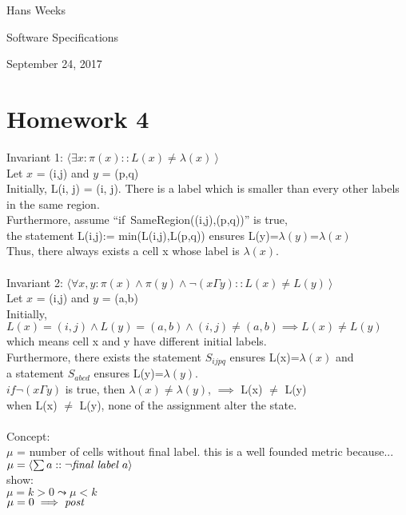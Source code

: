 \documentclass{article}
\begin{document}
\hfill Hans Weeks

\hfill Software Specifications

\hfill September 24, 2017
\section*{Homework 4}
Invariant 1: $\langle \exists x: \pi(x) :: L(x) \neq \lambda(x) \ \rangle$ \\
Let $x$ = (i,j)  and $y$ = (p,q)\\
Initially, L(i, j) = (i, j). There is a label which is smaller than every other labels in the same region.\\
Furthermore, assume ``if\ SameRegion((i,j),(p,q))'' is true,\\
the statement L(i,j):= min(L(i,j),L(p,q)) ensures L(y)=$\lambda(y)$=$\lambda(x)$\\
Thus, there always exists a cell x whose label is $\lambda(x)$.\\
\\
Invariant 2: $\langle \forall x,y: \pi(x) \wedge \pi(y) \wedge \neg(x \Gamma y) :: L(x) \neq L(y) \ \rangle$ \\
Let $x$ = (i,j)  and $y$ = (a,b)\\
Initially, $L(x) = (i,j) \wedge L(y) = (a,b) \wedge (i,j)\neq(a,b) \implies L(x) \neq L(y)$\\
which means cell x and y have different initial labels.\\
Furthermore, there exists the statement $S_{ijpq}$ ensures L(x)=$\lambda(x)$ and\\a statement $S_{abcd}$ ensures L(y)=$\lambda(y)$.\\
$if \neg(x \Gamma y)$ is true, then $\lambda(x)$$\neq$$\lambda(y)$, $\implies$ L(x) $\neq$ L(y)\\
when L(x) $\neq$ L(y), none of the assignment alter the state.\\
\\
Concept:\\ $\mu$ = number of cells without final label. this is a well founded metric because...\\
$\mu = \langle \sum a :: \neg \emph{final label } a \rangle$\\
show:\\
$\mu=k>0 \leadsto \mu<k$\\
$\mu=0\implies \emph{post}$\\
\end{document}
